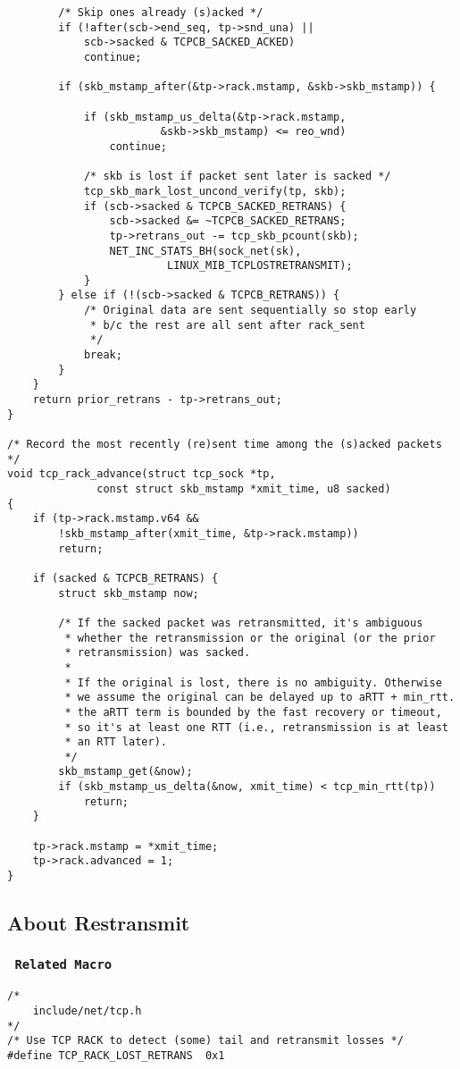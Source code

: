 \begin{verbatim}
		/* Skip ones already (s)acked */
		if (!after(scb->end_seq, tp->snd_una) ||
		    scb->sacked & TCPCB_SACKED_ACKED)
			continue;

		if (skb_mstamp_after(&tp->rack.mstamp, &skb->skb_mstamp)) {

			if (skb_mstamp_us_delta(&tp->rack.mstamp,
						&skb->skb_mstamp) <= reo_wnd)
				continue;

			/* skb is lost if packet sent later is sacked */
			tcp_skb_mark_lost_uncond_verify(tp, skb);
			if (scb->sacked & TCPCB_SACKED_RETRANS) {
				scb->sacked &= ~TCPCB_SACKED_RETRANS;
				tp->retrans_out -= tcp_skb_pcount(skb);
				NET_INC_STATS_BH(sock_net(sk),
						 LINUX_MIB_TCPLOSTRETRANSMIT);
			}
		} else if (!(scb->sacked & TCPCB_RETRANS)) {
			/* Original data are sent sequentially so stop early
			 * b/c the rest are all sent after rack_sent
			 */
			break;
		}
	}
	return prior_retrans - tp->retrans_out;
}

/* Record the most recently (re)sent time among the (s)acked packets */
void tcp_rack_advance(struct tcp_sock *tp,
		      const struct skb_mstamp *xmit_time, u8 sacked)
{
	if (tp->rack.mstamp.v64 &&
	    !skb_mstamp_after(xmit_time, &tp->rack.mstamp))
		return;

	if (sacked & TCPCB_RETRANS) {
		struct skb_mstamp now;

		/* If the sacked packet was retransmitted, it's ambiguous
		 * whether the retransmission or the original (or the prior
		 * retransmission) was sacked.
		 *
		 * If the original is lost, there is no ambiguity. Otherwise
		 * we assume the original can be delayed up to aRTT + min_rtt.
		 * the aRTT term is bounded by the fast recovery or timeout,
		 * so it's at least one RTT (i.e., retransmission is at least
		 * an RTT later).
		 */
		skb_mstamp_get(&now);
		if (skb_mstamp_us_delta(&now, xmit_time) < tcp_min_rtt(tp))
			return;
	}

	tp->rack.mstamp = *xmit_time;
	tp->rack.advanced = 1;
}
\end{verbatim}
	\subsection{About Restransmit}
		\subsubsection{\texttt{ Related Macro}}
\begin{verbatim}
/*
	include/net/tcp.h
*/
/* Use TCP RACK to detect (some) tail and retransmit losses */
#define TCP_RACK_LOST_RETRANS  0x1
\end{verbatim}

